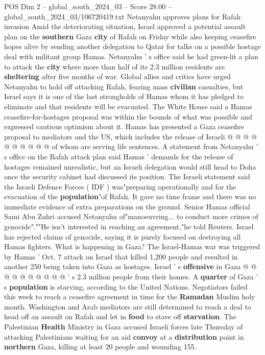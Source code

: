 \begin{textsample}{POS Dim 2 – global\_south\_2024\_03 – Score 28.00 – global\_south\_2024\_03/106720419.txt}
Netanyahu approves plans for Rafah invasion Amid the deteriorating situation, Israel approved a potential assault plan on the \textbf{southern} Gaza \textbf{city} of Rafah on Friday while also keeping ceasefire hopes alive by sending another delegation to Qatar for talks on a possible hostage deal with militant group Hamas.
Netanyahu ' s office said he had green-lit a plan to attack the \textbf{city} where more than half of its 2.3 million residents are \textbf{sheltering} after five months of war.
Global allies and critics have urged Netanyahu to hold off attacking Rafah, fearing mass \textbf{civilian} casualties, but Israel says it is one of the last strongholds of Hamas whom it has pledged to eliminate and that residents will be evacuated.
The White House said a Hamas ceasefire-for-hostages proposal was within the bounds of what was possible and expressed cautious optimism about it.
Hamas has presented a Gaza ceasefire proposal to mediators and the US, which includes the release of Israeli @ @ @ @ @ @ @ @ @ @ of whom are serving life sentences.
A statement from Netanyahu ' s office on the Rafah attack plan said Hamas ' demands for the release of hostages remained unrealistic, but an Israeli delegation would still head to Doha once the security cabinet had discussed its position.
The Israeli statement said the Israeli Defence Forces ( IDF ) was"preparing operationally and for the evacuation of the \textbf{population}"of Rafah.
It gave no time frame and there was no immediate evidence of extra preparations on the ground.
Senior Hamas official Sami Abu Zuhri accused Netanyahu of"manoeuvring... to conduct more crimes of genocide".""He isn't interested in reaching an agreement,"he told Reuters.
Israel has rejected claims of genocide, saying it is purely focused on destroying all Hamas fighters.
What is happening in Gaza?
The Israel-Hamas war was triggered by Hamas ' Oct. 7 attack on Israel that killed 1,200 people and resulted in another 250 being taken into Gaza as hostages.
Israel ' s \textbf{offensive} in Gaza @ @ @ @ @ @ @ @ @ @ ' s 2.3 million people from their homes.
A \textbf{quarter} of Gaza ' s \textbf{population} is starving, according to the United Nations.
Negotiators failed this week to reach a ceasefire agreement in time for the \textbf{Ramadan} Muslim holy month.
Washington and Arab mediators are still determined to reach a deal to head off an assault on Rafah and let in \textbf{food} to stave off \textbf{starvation}.
The Palestinian \textbf{Health} Ministry in Gaza accused Israeli forces late Thursday of attacking Palestinians waiting for an aid \textbf{convoy} at a \textbf{distribution} point in \textbf{northern} Gaza, killing at least 20 people and wounding 155.

\end{textsample}
